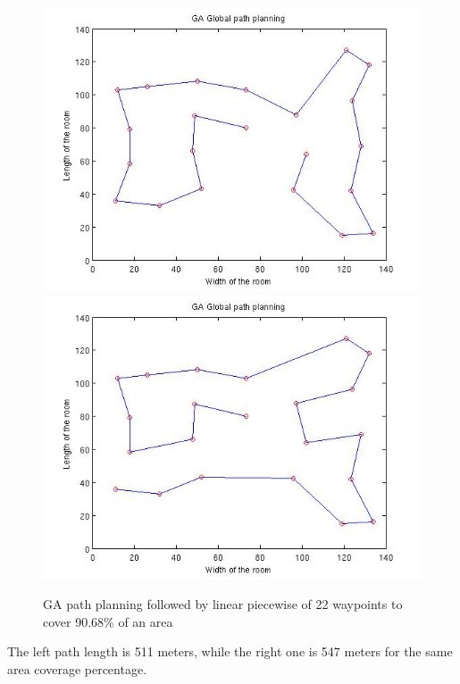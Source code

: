 \begin{figure}[H]
  \includegraphics[width=\linewidth]{figures/22pts_GA_linear_2D.jpg}  
  \endminipage \hfill
  \includegraphics[width=\linewidth]{figures/22pts_GA_linear_2D_2.jpg}  
  \endminipage \hfill
  \caption{GA path planning followed by linear piecewise of 22 waypoints to cover 90.68\% of an area}
  \label{fig:Path_planning}
\end{figure}

The left path length is 511 meters, while the right one is 547 meters for the same area coverage percentage. 

